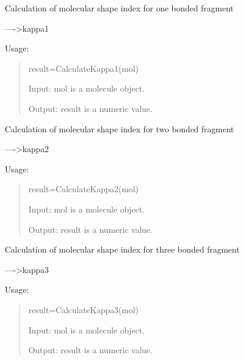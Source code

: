 \documentclass[letterpaper,10pt,english]{sphinxmanual}
\begin{document}

\begin{fulllineitems}
\label{reference/kappa:kappa.CalculateKappa1}
Calculation of molecular shape index for one bonded fragment

----\textgreater{}kappa1

Usage:
\begin{quote}

result=CalculateKappa1(mol)

Input: mol is a molecule object.

Output: result is a numeric value.
\end{quote}

\end{fulllineitems}


\begin{fulllineitems}
\label{reference/kappa:kappa.CalculateKappa2}
Calculation of molecular shape index for two bonded fragment

----\textgreater{}kappa2

Usage:
\begin{quote}

result=CalculateKappa2(mol)

Input: mol is a molecule object.

Output: result is a numeric value.
\end{quote}

\end{fulllineitems}


\begin{fulllineitems}
\label{reference/kappa:kappa.CalculateKappa3}
Calculation of molecular shape index for three bonded fragment

----\textgreater{}kappa3

Usage:
\begin{quote}

result=CalculateKappa3(mol)

Input: mol is a molecule object.

Output: result is a numeric value.
\end{quote}

\end{fulllineitems}
\end{document}
